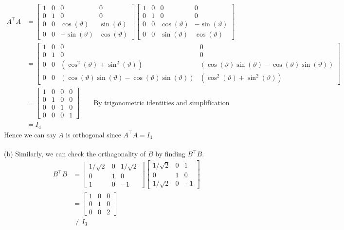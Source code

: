 \documentclass{report}
\begin{document}
$$
\begin{aligned}
A^\top A & = 
\begin{bmatrix}
1 & 0 & 0 & 0 \\
0 & 1 & 0 & 0 \\
0 & 0 & \cos (\vartheta) & \sin (\vartheta) \\
0 & 0 & -\sin (\vartheta) & \cos (\vartheta)
\end{bmatrix}
\begin{bmatrix}
1 & 0 & 0 & 0 \\
0 & 1 & 0 & 0 \\
0 & 0 & \cos (\vartheta) & -\sin (\vartheta) \\
0 & 0 & \sin (\vartheta) & \cos (\vartheta)
\end{bmatrix}\\
&=
\begin{bmatrix}
1&0&0&0\\
0&1&0&0\\
0&0&(\cos^2(\vartheta)+\sin^2(\vartheta))&(\cos(\vartheta)\sin(\vartheta)-\cos(\vartheta)\sin(\vartheta))\\
0&0&(\cos(\vartheta)\sin(\vartheta)-\cos(\vartheta)\sin(\vartheta))&(\cos^2(\vartheta)+\sin^2(\vartheta))
\end{bmatrix}\\
&=
\begin{bmatrix}
1&0&0&0\\
0&1&0&0\\
0&0&1&0\\
0&0&0&1
\end{bmatrix} \qquad \text{By trigonometric identities and simplification}\\
&= I_4
\end{aligned}
$$
Hence we can say $A$ is orthogonal since $A^\top A = I_4$ \\
\\
\noindent(b) Similarly, we can check the orthagonality of $B$ by finding $B^\top B$.
$$
\begin{aligned}
B^\top B &= \begin{bmatrix}
1/\sqrt{2}&0&1/\sqrt{2}\\
0&1&0\\
1&0&-1
\end{bmatrix}\begin{bmatrix}
1/\sqrt{2}&0&1\\
0&1&0\\
1/\sqrt{2}&0&-1
\end{bmatrix}\\
&= \begin{bmatrix}
1&0&0\\
0&1&0\\
0&0&2
\end{bmatrix}\\
&\ne I_3
\end{aligned}
$$
\end{document}
